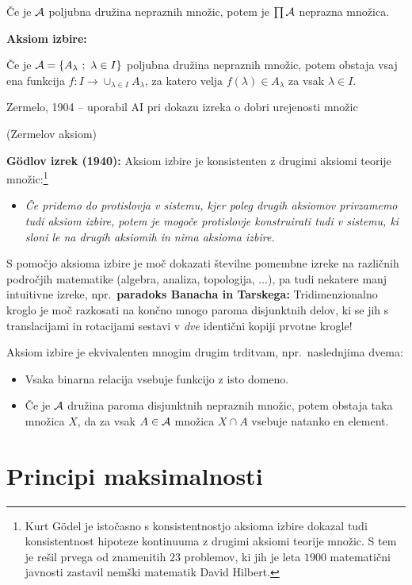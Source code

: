 \documentclass[11pt,paper=b5,DIV=13,headinclude,footinclude]{scrbook}
\begin{document}
Če je ${\cal A}$ poljubna družina nepraznih množic, potem je $\prod {\cal A}$ neprazna množica.

\bigskip
\textbf{Aksiom izbire:}

Če je ${\cal A} = \{A_\lambda~;~\lambda\in I\}$ poljubna družina nepraznih množic,
potem obstaja vsaj ena funkcija $f:I\to \cup_{\lambda \in I}A_\lambda$, za katero velja
$f(\lambda)\in A_\lambda$ za vsak $\lambda\in I$.

Zermelo, 1904 -- uporabil AI pri dokazu izreka o dobri urejenosti množic

(Zermelov aksiom)


\bigskip

\textbf{G\"odlov izrek (1940):} Aksiom izbire je konsistenten z drugimi aksiomi teorije množic:\footnote{Kurt G\"odel je istočasno s konsistentnostjo aksioma izbire dokazal tudi konsistentnost hipoteze kontinuuma z drugimi aksiomi teorije množic. S tem je rešil prvega od znamenitih $23$ problemov, ki jih je leta $1900$ matematični javnosti zastavil
nemški matematik David Hilbert.}
\begin{itemize}
  \item \emph{ Če pridemo do protislovja v sistemu, kjer poleg drugih aksiomov privzamemo tudi aksiom izbire, potem je mogoče protislovje konstruirati tudi v sistemu, ki sloni le na drugih aksiomih in nima aksioma izbire.}
\end{itemize}

\bigskip
S pomočjo aksioma izbire je moč dokazati številne pomembne izreke na različnih področjih matematike (algebra, analiza, topologija, $\ldots$), pa tudi nekatere manj intuitivne izreke, npr.~\textbf{paradoks Banacha in Tarskega:} Tridimenzionalno kroglo je moč razkosati na končno mnogo paroma disjunktnih delov, ki se jih s translacijami in rotacijami sestavi v {\em dve} identični kopiji prvotne krogle!

\bigskip
Aksiom izbire je ekvivalenten mnogim drugim trditvam, npr.~naslednjima dvema:
\begin{itemize}
  \item Vsaka binarna relacija vsebuje funkcijo z isto domeno.
  \item Če je ${\cal A}$ družina paroma disjunktnih nepraznih množic, potem obstaja taka  množica $X$, da za vsak $A\in {\cal A}$ množica $X\cap A$ vsebuje natanko en element.
\end{itemize}


\section{Principi maksimalnosti}
\end{document}
